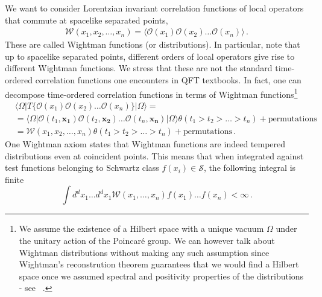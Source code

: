 We want to consider Lorentzian invariant correlation functions of local operators that commute at spacelike separated points,
\begin{align}
  \mathcal{W}\left(x_1, x_2,\dots,x_n\right)=\langle \mathcal{O}(x_1)\mathcal{O}(x_2)\dots \mathcal{O}(x_n)\rangle\,.
\end{align}
These are called Wightman functions (or distributions). In particular, note that up to spacelike separated points, different orders of local operators give rise to different Wightman functions. We stress that these are not the standard time-ordered correlation functions one encounters in QFT textbooks. In fact, one can decompose time-ordered correlation functions in terms of Wightman functions\footnote{We  assume the existence of a Hilbert space with a unique vacuum $\Omega$ under the unitary action of the Poincar\'e group. We can however talk about Wightman distributions without making any such assumption since Wightman's reconstrution theorem guarantees that we would find a Hilbert space once we assumed spectral and positivity properties of the distributions - see ~\cite{Kravchuk:2021kwe, Streater:1989vi}.}
\begin{align}
   & \langle \Omega | T\{\mathcal{O}(x_1) \mathcal{O}(x_2) \dots \mathcal{O}(x_n)\} | \Omega \rangle=                                                                                         \\
   & =\langle \Omega| \mathcal{O}(t_1,\mathbf{x_1}) \mathcal{O}(t_2, \mathbf{x_2}) \dots \mathcal{O}(t_n,\mathbf{x_n})| \Omega\rangle \theta(t_1>t_2>\dots>t_n)+ \text{permutations}\nonumber \\
   & =\mathcal{W}(x_1,x_2,\dots, x_n)\theta(t_1>t_2>\dots>t_n)+ \text{permutations}\nonumber\,.
\end{align}
One Wightman axiom states that Wightman functions are indeed tempered distributions even at coincident points.
This means that when integrated against test functions belonging to Schwartz class $f(x_i)\in \mathcal{S}$, the following integral is finite
\begin{equation}
  \int d^d x_1\dots d^d x_1 \mathcal{W}(x_1,\dots,x_n) f(x_1)\dots f(x_n)<\infty\,.
\end{equation}

